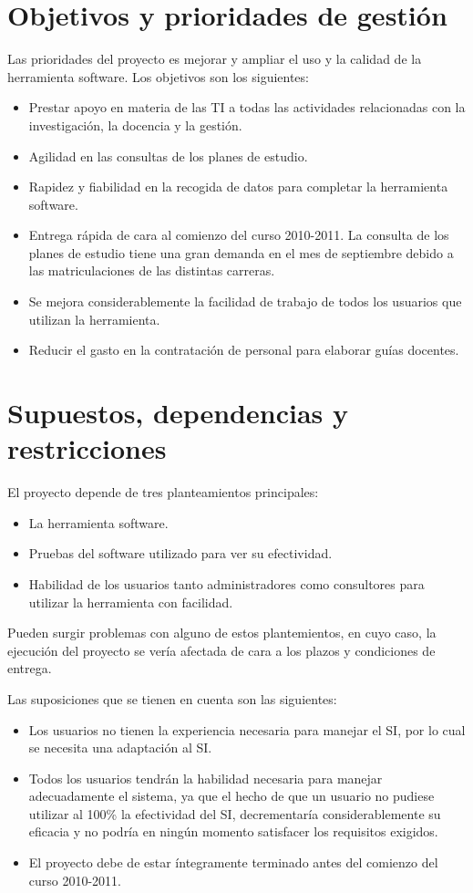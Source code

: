 \documentclass[11pt,a4paper,spanish,twoside]{report}
\begin{document}
\section{Objetivos y prioridades de gestión}
Las prioridades del proyecto es mejorar y ampliar el uso y la calidad de la
herramienta software. Los objetivos son los siguientes:
\begin{itemize}

\item Prestar apoyo en materia de las TI a todas las actividades relacionadas
  con la investigación, la docencia y la gestión.
\item Agilidad en las consultas de los planes de estudio.
\item Rapidez y fiabilidad en la recogida de datos para completar la
  herramienta software.
\item Entrega rápida de cara al comienzo del curso 2010-2011. La consulta de
  los planes de estudio tiene una gran demanda en el mes de septiembre debido
  a las matriculaciones de las distintas carreras.
\item Se mejora considerablemente la facilidad de trabajo de todos los
  usuarios que utilizan la herramienta.
\item Reducir el gasto en la contratación de personal para elaborar guías
  docentes. 
\end{itemize}

\section{Supuestos, dependencias y restricciones}
El proyecto depende de tres planteamientos principales:
\begin{itemize}
\item La herramienta software.
\item Pruebas del software utilizado para ver su efectividad.
\item Habilidad de los usuarios tanto administradores como consultores para
  utilizar la herramienta con facilidad.
\end{itemize}
Pueden surgir problemas con alguno de estos plantemientos, en cuyo caso, la
ejecución del proyecto se vería afectada de cara a los plazos y condiciones
de entrega.

Las suposiciones que se tienen en cuenta son las siguientes:
\begin{itemize}
\item Los usuarios no tienen la experiencia necesaria para manejar el SI, por
  lo cual se necesita una adaptación al SI. 
\item Todos los usuarios tendrán la habilidad necesaria para manejar
  adecuadamente el sistema, ya que el hecho de que un usuario no pudiese
  utilizar al 100\% la efectividad del SI, decrementaría considerablemente su
  eficacia y no podría en ningún momento satisfacer los requisitos exigidos.
\item El proyecto debe de estar íntegramente terminado antes del comienzo del
  curso 2010-2011.
\end{itemize}
\end{document}
